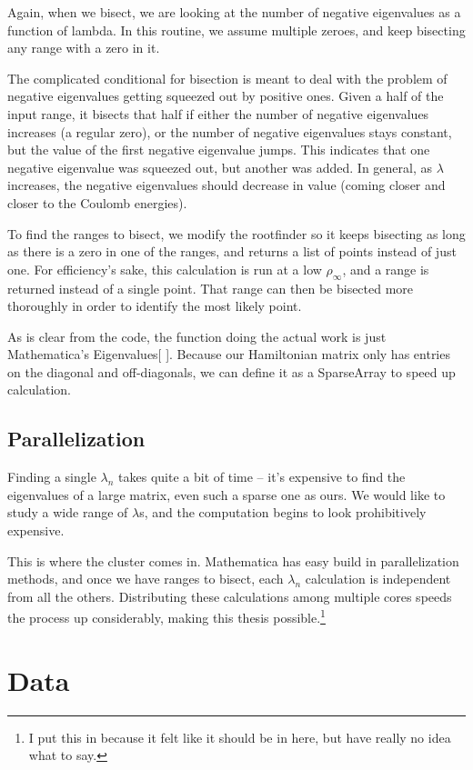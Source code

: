 \documentclass[12pt,twoside]{reedthesis}
\begin{document}
Again, when we bisect, we are looking at the number of negative eigenvalues as a function of lambda. In this routine, we assume multiple zeroes, and keep bisecting any range with a zero in it.

The complicated conditional for bisection is meant to deal with the problem of negative eigenvalues getting squeezed out by positive ones. Given a half of the input range, it bisects that half if either the number of negative eigenvalues increases (a regular zero), or the number of negative eigenvalues stays constant, but the value of the first negative eigenvalue jumps. This indicates that one negative eigenvalue was squeezed out, but another was added. In general, as $\lambda$ increases, the negative eigenvalues should decrease in value (coming closer and closer to the Coulomb energies). 

To find the ranges to bisect, we modify the rootfinder so it keeps bisecting as long as there is a zero in one of the ranges, and returns a list of points instead of just one. For efficiency's sake, this calculation is run at a low $\rho_{\infty}$, and a range is returned instead of a single point. That range can then be bisected more thoroughly in order to identify the most likely point. 

As is clear from the code, the function doing the actual work is just Mathematica's Eigenvalues[ ]. Because our Hamiltonian matrix only has entries on the diagonal and off-diagonals, we can define it as a SparseArray to speed up calculation. 

\section{Parallelization}

Finding a single $\lambda_{n}$ takes quite a bit of time -- it's expensive to find the eigenvalues of a large matrix, even such a sparse one as ours. We would like to study a wide range of $\lambda$s, and the computation begins to look prohibitively expensive.

This is where the cluster comes in. Mathematica has easy build in parallelization methods, and once we have ranges to bisect, each $\lambda_{n}$ calculation is independent from all the others. Distributing these calculations among multiple cores speeds the process up considerably, making this thesis possible.\footnote{I put this in because it felt like it should be in here, but have really no idea what to say.}

\chapter{Data}
\end{document}

